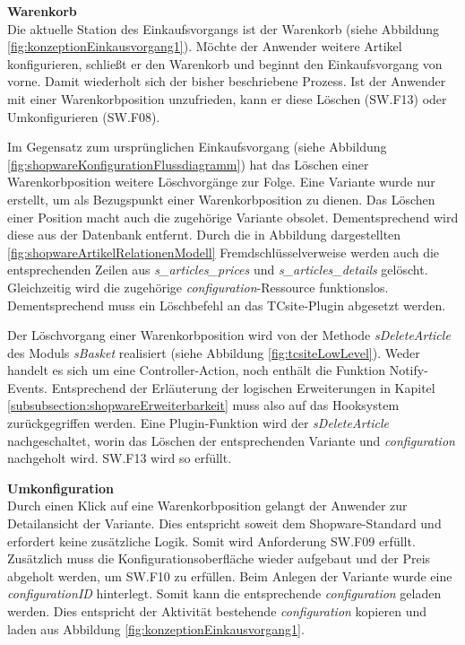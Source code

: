 \documentclass[12pt,a4paper,bibliography=totocnumbered,listof=totoc]{scrartcl}
\begin{document}
\textbf{Warenkorb}\\
Die aktuelle Station des Einkaufsvorgangs ist der Warenkorb (siehe Abbildung \ref{fig:konzeptionEinkausvorgang1}). Möchte der Anwender weitere Artikel konfigurieren, schließt er den Warenkorb und beginnt den Einkaufsvorgang von vorne. Damit wiederholt sich der bisher beschriebene Prozess. Ist der Anwender mit einer Warenkorbposition unzufrieden, kann er diese Löschen (SW.F13) oder Umkonfigurieren (SW.F08).

Im Gegensatz zum ursprünglichen Einkaufsvorgang (siehe Abbildung \ref{fig:shopwareKonfigurationFlussdiagramm}) hat das Löschen einer Warenkorbposition weitere Löschvorgänge zur Folge. Eine Variante wurde nur erstellt, um als Bezugspunkt einer Warenkorbposition zu dienen. Das Löschen einer Position macht auch die zugehörige Variante obsolet. Dementsprechend wird diese aus der Datenbank entfernt. Durch die in Abbildung dargestellten \ref{fig:shopwareArtikelRelationenModell} Fremdschlüsselverweise werden auch die entsprechenden Zeilen aus \emph{s\_articles\_prices} und \emph{s\_articles\_details}  gelöscht. Gleichzeitig wird die zugehörige \emph{configuration}-Ressource funktionslos. Dementsprechend muss ein Löschbefehl an das TCsite-Plugin abgesetzt werden.

Der Löschvorgang einer Warenkorbposition wird von der Methode \emph{sDeleteArticle} des Moduls \emph{sBasket} realisiert (siehe Abbildung \ref{fig:tcsiteLowLevel}). Weder handelt es sich um eine Controller-Action, noch enthält die Funktion Notify-Events. Entsprechend der Erläuterung der logischen Erweiterungen in Kapitel \ref{subsubsection:shopwareErweiterbarkeit} muss also auf das Hooksystem zurückgegriffen werden. Eine Plugin-Funktion wird der \emph{sDeleteArticle} nachgeschaltet, worin das Löschen der entsprechenden Variante und \emph{configuration} nachgeholt wird. SW.F13 wird so erfüllt.

\textbf{Umkonfiguration}\\
Durch einen Klick auf eine Warenkorbposition gelangt der Anwender zur Detailansicht der Variante. Dies entspricht soweit dem Shopware-Standard und erfordert keine zusätzliche Logik. Somit wird Anforderung SW.F09 erfüllt. Zusätzlich muss die Konfigurationsoberfläche wieder aufgebaut und der Preis abgeholt werden, um SW.F10 zu erfüllen. Beim Anlegen der Variante wurde eine \emph{configurationID} hinterlegt. Somit kann die entsprechende \emph{configuration} geladen werden. Dies entspricht der Aktivität \glqq bestehende \emph{configuration} kopieren und laden\grqq{} aus Abbildung \ref{fig:konzeptionEinkausvorgang1}.
\end{document}
